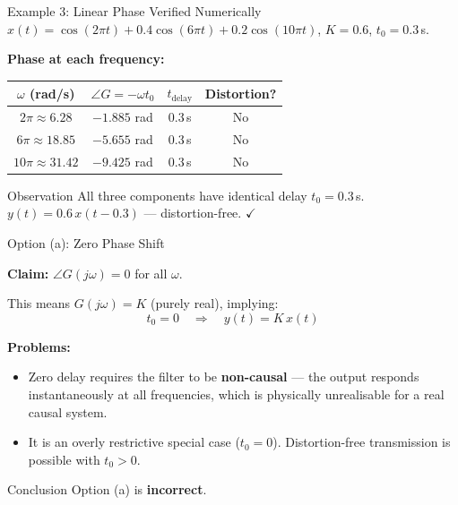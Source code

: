 \documentclass{beamer}
\begin{document}
\begin{frame}{Example 3: Linear Phase Verified Numerically}
$x(t) = \cos(2\pi t) + 0.4\cos(6\pi t) + 0.2\cos(10\pi t)$, $K=0.6$, $t_0=0.3\,$s.

\vspace{0.3em}
\textbf{Phase at each frequency:}

\vspace{0.2em}
\begin{center}
\renewcommand{\arraystretch}{1.4}
\begin{tabular}{|c|c|c|c|}
\hline
$\omega$ (rad/s) & $\angle G = -\omega t_0$ & $t_{\text{delay}}$ & Distortion? \\
\hline
$2\pi \approx 6.28$ & $-1.885$ rad & $0.3\,$s & No \\
$6\pi \approx 18.85$ & $-5.655$ rad & $0.3\,$s & No \\
$10\pi \approx 31.42$ & $-9.425$ rad & $0.3\,$s & No \\
\hline
\end{tabular}
\end{center}

\vspace{0.4em}
\begin{block}{Observation}
All three components have identical delay $t_0 = 0.3\,$s. \\
$y(t) = 0.6\,x(t - 0.3)$ — distortion-free. $\checkmark$
\end{block}
\end{frame}

\begin{frame}{Option (a): Zero Phase Shift}

\textbf{Claim:} $\angle G(j\omega) = 0$ for all $\omega$.

\vspace{0.5em}
This means $G(j\omega) = K$ (purely real), implying:
\[
  t_0 = 0 \quad \Longrightarrow \quad y(t) = K\,x(t)
\]

\vspace{0.4em}
\textbf{Problems:}
\begin{itemize}
  \item Zero delay requires the filter to be \textbf{non-causal} — the output
        responds instantaneously at all frequencies, which is physically
        unrealisable for a real causal system.
  \item It is an overly restrictive special case ($t_0 = 0$). Distortion-free
        transmission is possible with $t_0 > 0$.
\end{itemize}

\vspace{0.4em}
\begin{block}{Conclusion}
  Option (a) is \textbf{incorrect}.
\end{block}
\end{frame}
\end{document}
